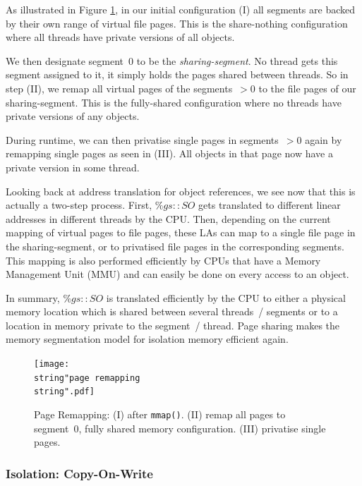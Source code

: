 \documentclass{sigplanconf}
\begin{document}
As illustrated in Figure \ref{fig:Page-Remapping}, in our initial
configuration (I) all segments are backed by their own range of
virtual file pages. This is the share-nothing configuration where
all threads have private versions of all objects.

We then designate segment~0 to be the \emph{sharing-segment}. No
thread gets this segment assigned to it, it simply holds the pages
shared between threads. So in step (II), we remap all virtual pages of
the segments~$>0$ to the file pages of our sharing-segment. This is
the fully-shared configuration where no threads have private versions
of any objects.

During runtime, we can then privatise single pages in segments~$>0$
again by remapping single pages as seen in (III). All objects in that
page now have a private version in some thread.

Looking back at address translation for object references, we see now
that this is actually a two-step process. First, $\%gs{::}SO$ gets
translated to different linear addresses in different threads by the
CPU. Then, depending on the current mapping of virtual pages to file
pages, these LAs can map to a single file page in the sharing-segment,
or to privatised file pages in the corresponding segments. This
mapping is also performed efficiently by CPUs that have a Memory
Management Unit (MMU) and can easily be done on every access to an
object.

In summary, $\%gs{::}SO$ is translated efficiently by the CPU to
either a physical memory location which is shared between several
threads~/ segments or to a location in memory private to the segment~/
thread. Page sharing makes the memory segmentation model for isolation
memory efficient again.

\begin{figure}[h]
  \centering
  \texttt{[image: \\string"page remapping\\string".pdf]}
  \caption{Page Remapping: (I) after \texttt{mmap()}. (II) remap all pages to
    segment~0, fully shared memory configuration. (III) privatise single
    pages.\label{fig:Page-Remapping}}
\end{figure}



\subsubsection{Isolation: Copy-On-Write}
\end{document}

